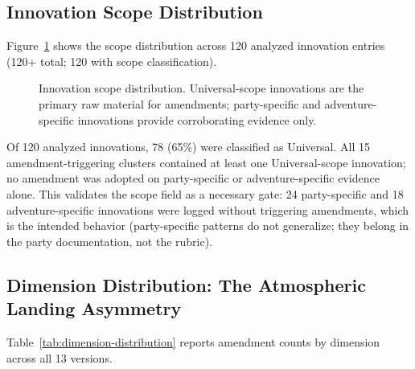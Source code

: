 \subsection{Innovation Scope Distribution}

Figure~\ref{fig:taxonomy} shows the scope distribution across 120 analyzed
innovation entries (120+ total; 120 with scope classification).

\begin{figure}[t]
  \centering
  \caption{Innovation scope distribution. Universal-scope innovations
    are the primary raw material for amendments; party-specific and
    adventure-specific innovations provide corroborating evidence only.}
  \label{fig:taxonomy}
\end{figure}

Of 120 analyzed innovations, 78 (65\%) were classified as Universal. All 15
amendment-triggering clusters contained at least one Universal-scope innovation;
no amendment was adopted on party-specific or adventure-specific evidence alone.
This validates the scope field as a necessary gate: 24 party-specific and 18
adventure-specific innovations were logged without triggering amendments, which
is the intended behavior (party-specific patterns do not generalize; they belong
in the party documentation, not the rubric).

\subsection{Dimension Distribution: The Atmospheric Landing Asymmetry}

Table~\ref{tab:dimension-distribution} reports amendment counts by dimension
across all 13 versions.

